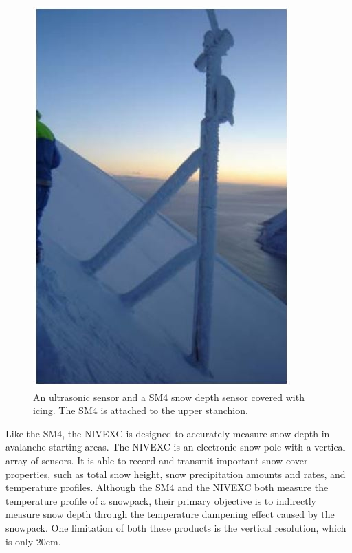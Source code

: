  \begin{figure}[!t]
    \centering
    \includegraphics[width=0.8\linewidth]{figures/SM4.JPG}
    \caption{An ultrasonic sensor and a SM4 snow depth sensor covered with icing. The SM4 is attached to the upper stanchion.}
    \label{fig:SM4}
 \end{figure}
 
Like the SM4, the NIVEXC \citep{barbolininivexc} is designed to accurately measure snow depth in avalanche starting areas. The NIVEXC is an electronic snow-pole with a vertical array of sensors. It is able to record and transmit important snow cover properties, such as total snow height, snow precipitation amounts and rates, and temperature profiles. Although the SM4 and the NIVEXC both measure the temperature profile of a snowpack, their primary objective is to indirectly measure snow depth through the temperature dampening effect caused by the snowpack. One limitation of both these products is the vertical resolution, which is only 20cm. 

